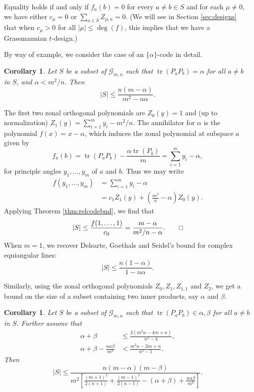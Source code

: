 \documentclass[12pt]{article}
\numberwithin{equation}{section}
\theoremstyle{plainsl}
\newtheorem{corollary}[theorem]{Corollary}
\renewenvironment{proof}{\noindent{{\sl Proof. }}}{\medbreak}
\def\sqr#1#2{{\vbox{\hrule height.#2pt
    \hbox{\vrule width.#2pt height#1pt \kern#1pt
        \vrule width.#2pt}\hrule height.#2pt}}}
\def\eqed{\tag*{\sqr53}}
\newcommand\al{\alpha}
\newcommand\be{\beta}
\newcommand\gras[2]{\mathcal{G}_{#1,#2}}
\newcommand\abs[1]{\left|#1\right|}
\newcommand\opk[1]{\mathop{\mathrm{#1}}\nolimits}
\newcommand\tr{\opk{tr}}
\begin{document}
Equality holds if and only if $f_a(b) = 0$ for every $a \neq b \in S$ and for each $\mu \neq 0$, we have either $c_\mu = 0$ or $\sum_{a \in S} Z_{\mu,a} = 0$. (We will see in Section \ref{sec:designs} that when $c_\mu > 0$ for all $\abs{\mu} \leq \deg(f)$, this implies that we have a Grassmannian $t$-design.)

By way of example, we consider the case of an $\{\al\}$-code in detail.

\begin{corollary}
\label{cor:onebound}
Let $S$ be a subset of $\gras{m}{n}$ such that $\tr(P_aP_b) = \al$ for all $a \neq b$ in $S$, and $\al < m^2/n$. Then
\[
|S| \leq \frac{n(m-\al)}{m^2-n\al}.
\]
\end{corollary}

\begin{proof}
The first two zonal orthogonal polynomials are $Z_0(y) = 1$ and (up to normalization) $Z_1(y) = \sum_{i=1}^my_i - m^2/n$. The annihilator for $\al$ is the polynomial $f(x) = x - \al$, which induces the zonal polynomial at subspace $a$ given by 
\[
f_{a}(b) = \tr(P_aP_b) - \frac{\al\tr(P_b)}{m} = \sum_{i=1}^m y_i - \al,
\]
for principle angles $y_1,\ldots,y_m$ of $a$ and $b$. Thus we may write
\begin{align*}
f(y_1,\ldots,y_m) & = \sum_{i=1}^m y_i - \al \\
& = c_1Z_{1}(y) + \left(\frac{m^2}{n}-\al\right)Z_{0}(y).
\end{align*}
Applying Theorem \ref{thm:relcodebnd}, we find that
\[
|S| \leq \frac{f(1,\ldots,1)}{c_0} = \frac{m-\al}{m^2/n-\al}. \eqed
\]
\end{proof}
When $m = 1$, we recover Delsarte, Goethals and Seidel's bound for complex equiangular lines: 
\[
|S| \leq \frac{n(1-\al)}{1-n\al}.
\]

Similarly, using the zonal orthogonal polynomials $Z_0,Z_1,Z_{1,1}$ and $Z_2$, we get a bound on the size of a subset containing two inner products, say $\al$ and $\be$.

\begin{corollary}
\label{cor:twobound}
Let $S$ be a subset of $\gras{m}{n}$ such that $\tr(P_aP_b) \in {\al,\be}$ for all $a \neq b$ in $S$. Further assume that
\begin{align*}
\al+\be & \leq \frac{2(m^2n-4m+n)}{n^2-4}, \\
\al + \be - \frac{n\al\be}{m^2} & < \frac{m^2n-2m+n}{n^2-1}.
\end{align*}
Then
\[
|S| \leq \frac{n(m-\al)(m-\be)}{m^2\left[\frac{(m+1)^2}{2(n+1)}+\frac{(m-1)^2}{2(n-1)}-(\al+\be) + \frac{n\al\be}{m^2}\right]}.
\]
\end{corollary}
\end{document}
